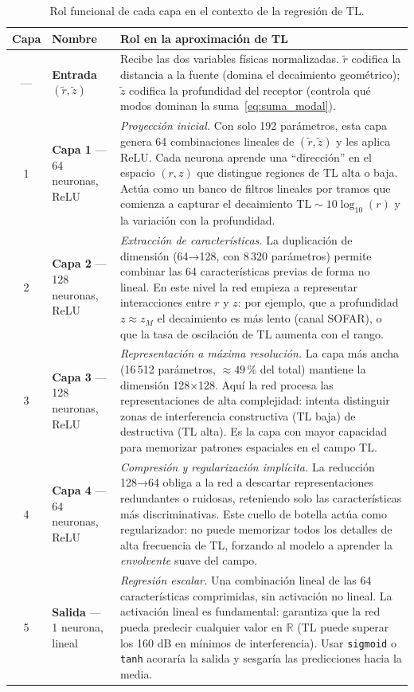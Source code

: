 \documentclass[12pt,a4paper]{article}
\newcommand{\TL}{\mathrm{TL}}
\newcommand{\rnorm}{\tilde{r}}
\newcommand{\znorm}{\tilde{z}}
\begin{document}
\begin{table}[H]
\centering
\caption{Rol funcional de cada capa en el contexto de la regresión de TL.}
\label{tab:roles}
\begin{tabular}{clp{9cm}}
\toprule
Capa & Nombre & Rol en la aproximación de TL \\
\midrule
---
& \textbf{Entrada} $(\rnorm, \znorm)$
& Recibe las dos variables físicas normalizadas. $\rnorm$ codifica la
  distancia a la fuente (domina el decaimiento geométrico);
  $\znorm$ codifica la profundidad del receptor (controla qué modos
  dominan la suma~\eqref{eq:suma_modal}). \\[6pt]
1
& \textbf{Capa 1} — 64 neuronas, ReLU
& \emph{Proyección inicial.} Con solo 192 parámetros, esta capa genera
  64 combinaciones lineales de $(\rnorm,\znorm)$ y les aplica ReLU.
  Cada neurona aprende una ``dirección'' en el espacio $(r,z)$ que
  distingue regiones de TL alta o baja. Actúa como un banco de filtros
  lineales por tramos que comienza a capturar el decaimiento
  $\TL \sim 10\log_{10}(r)$ y la variación con la profundidad. \\[6pt]
2
& \textbf{Capa 2} — 128 neuronas, ReLU
& \emph{Extracción de características.} La duplicación de dimensión
  (64→128, con 8\,320 parámetros) permite combinar las 64 características
  previas de forma no lineal. En este nivel la red empieza a representar
  interacciones entre $r$ y $z$: por ejemplo, que a profundidad
  $z \approx z_M$ el decaimiento es más lento (canal SOFAR), o que la
  tasa de oscilación de TL aumenta con el rango. \\[6pt]
3
& \textbf{Capa 3} — 128 neuronas, ReLU
& \emph{Representación a máxima resolución.} La capa más ancha
  (16\,512 parámetros, $\approx 49\,\%$ del total) mantiene la dimensión
  128×128. Aquí la red procesa las representaciones de alta complejidad:
  intenta distinguir zonas de interferencia constructiva (TL baja) de
  destructiva (TL alta). Es la capa con mayor capacidad para memorizar
  patrones espaciales en el campo TL. \\[6pt]
4
& \textbf{Capa 4} — 64 neuronas, ReLU
& \emph{Compresión y regularización implícita.} La reducción 128→64
  obliga a la red a descartar representaciones redundantes o ruidosas,
  reteniendo solo las características más discriminativas. Este cuello de
  botella actúa como regularizador: no puede memorizar todos los detalles
  de alta frecuencia de TL, forzando al modelo a aprender la \emph{envolvente}
  suave del campo. \\[6pt]
5
& \textbf{Salida} — 1 neurona, lineal
& \emph{Regresión escalar.} Una combinación lineal de las 64 características
  comprimidas, sin activación no lineal. La activación lineal es fundamental:
  garantiza que la red pueda predecir cualquier valor en
  $\mathbb{R}$ (TL puede superar los 160 dB en mínimos de interferencia).
  Usar \texttt{sigmoid} o \texttt{tanh} acoraría la salida y sesgaría las
  predicciones hacia la media. \\
\bottomrule
\end{tabular}
\end{table}
\end{document}
